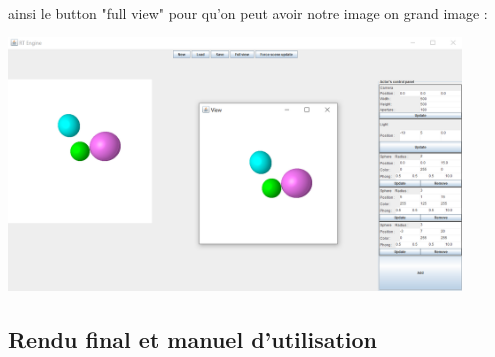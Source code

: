 \documentclass[12pt]{article}
\begin{document}
		\paragraph{}
            ainsi le button "full view" pour qu'on peut avoir notre image on grand image :
		        \begin{center}
	    	    \includegraphics[width=0.9\textwidth]{./images/full_view.png}
			    \end{center}
			

		\subsection{Rendu final et manuel d'utilisation}
\end{document}
